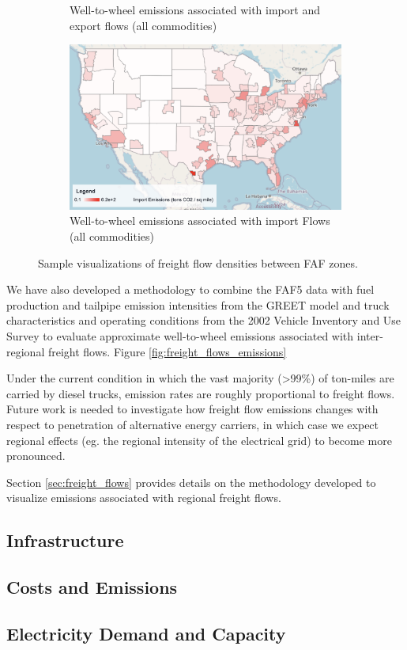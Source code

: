 \begin{figure}[ht]
\begin{subfigure}[b]{0.49\textwidth}
        \caption{Well-to-wheel emissions associated with import and export flows (all commodities)}
        \label{fig:import_export_emissions}
    \end{subfigure}
    \hfill
    \begin{subfigure}[b]{0.49\textwidth}
        \centering
        \includegraphics[width=\textwidth]{figures/import_emissions.png}
        \caption{Well-to-wheel emissions associated with import Flows (all commodities)}
        \label{fig:import_emissions}
    \end{subfigure}
    \caption{Sample visualizations of freight flow densities between FAF zones.}
    \label{fig:freight_flows}
\end{figure}

We have also developed a methodology to combine the FAF5 data with fuel production and tailpipe emission intensities from the GREET model \cite{GREET_2022} and truck characteristics and operating conditions from the 2002 Vehicle Inventory and Use Survey \cite{VIUS_2002} to evaluate approximate well-to-wheel emissions associated with inter-regional freight flows. Figure \ref{fig:freight_flows_emissions}

Under the current condition in which the vast majority (>99\%) of ton-miles are carried by diesel trucks, emission rates are roughly proportional to freight flows. Future work is needed to investigate how freight flow emissions changes with respect to penetration of alternative energy carriers, in which case we expect regional effects (eg. the regional intensity of the electrical grid) to become more pronounced. 

Section \ref{sec:freight_flows} provides details on the methodology developed to visualize emissions associated with regional freight flows. 

\subsection{Infrastructure}

\subsection{Costs and Emissions}

\subsection{Electricity Demand and Capacity}
